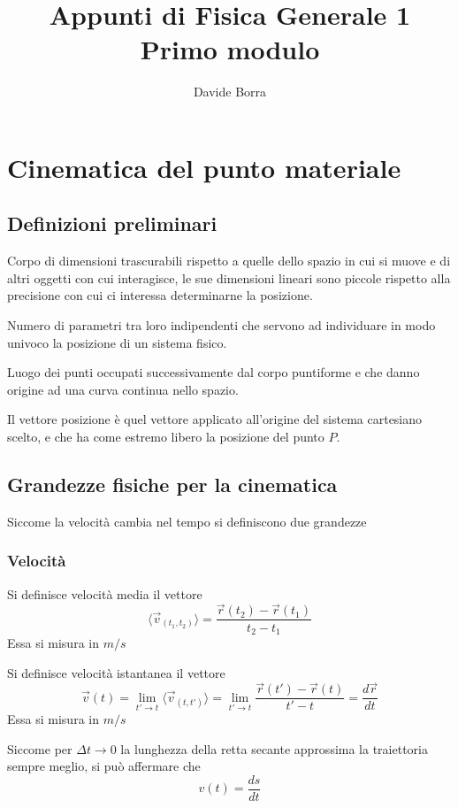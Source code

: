 \documentclass{article}
\title{Appunti di  Fisica Generale 1\\{\small Primo modulo}}
\author{Davide Borra}
\date{}
\theoremstyle{plain}
\begin{document}
\begin{titlepage}
    \maketitle
    \tableofcontents
    \creativecommons
\end{titlepage}
\section{Cinematica del punto materiale}
\subsection{Definizioni preliminari}
\begin{boxdef}
    Corpo di dimensioni trascurabili rispetto a quelle dello spazio in cui si muove e di altri oggetti con cui interagisce, le sue dimensioni lineari sono piccole rispetto alla precisione con cui ci interessa determinarne la posizione.
\end{boxdef}
\begin{boxdef}
    Numero di parametri tra loro indipendenti che servono ad individuare in modo univoco la posizione di un sistema fisico.
\end{boxdef}
\begin{boxdef}[Traiettoria]
    Luogo dei punti occupati successivamente dal corpo puntiforme e che danno origine ad una curva continua nello spazio.
\end{boxdef}
\begin{boxdef}
    Il vettore posizione è quel vettore applicato all’origine del sistema cartesiano scelto, e che ha come estremo libero la posizione del punto $P$.
\end{boxdef}
\subsection{Grandezze fisiche per la cinematica}
Siccome la velocità cambia nel tempo si definiscono due grandezze
\subsubsection{Velocità}
\begin{boxdef}
    Si definisce velocità media il vettore 
    \[\langle\vec{v}_{(t_1,t_2)}\rangle=\frac{\vec{r}(t_2)-\vec{r}(t_1)}{t_2-t_1}\]
    Essa si misura in ${m}/{s}$
\end{boxdef}
\begin{boxdef}
    Si definisce velocità istantanea il vettore
    \[\vec{v}(t)=\lim_{t'\to t}\langle\vec{v}_{(t,t')}\rangle=\lim_{t'\to t}\frac{\vec{r}(t')-\vec{r}(t)}{t'-t}= \frac{d \vec{r}}{d t}\]
    Essa si misura in ${m}/{s}$
\end{boxdef}
Siccome per $\Delta t\to 0$ la lunghezza della retta secante approssima la traiettoria sempre meglio, si può affermare che 
\[v(t)=\frac{ds}{dt}\]
\end{document}

